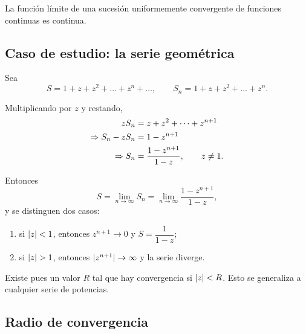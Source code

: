 \begin{observacion}
  La funci\'on l\'imite de una sucesi\'on uniformemente convergente de
  funciones continuas es continua.
\end{observacion}

\subsection{Caso de estudio: la serie geom\'etrica}
\label{subsec:serie_geometrica}

Sea
\begin{equation}
  \label{eq:geometrica}
  S=1+z+z^2+\dots+z^n+\dots,
  \qquad
  S_n=1+z+z^2+\dots+z^n .
\end{equation}

\begin{observacion}[El truco]
  Multiplicando por $z$ y restando,
  \begin{equation}
    \label{eq:truco_geometrica}
    \begin{aligned}
      zS_n&=z+z^2+\dots+z^{n+1}\\
      \Rightarrow S_n-zS_n&=1-z^{n+1}\\
      \Rightarrow S_n&=\frac{1-z^{n+1}}{1-z},\qquad z\neq 1 .
    \end{aligned}
  \end{equation}
\end{observacion}

Entonces
\begin{equation}
  \label{eq:limite_geometrica}
  S=\lim_{n\rightarrow\infty}S_n
   =\lim_{n\rightarrow\infty}\frac{1-z^{n+1}}{1-z},
\end{equation}
y se distinguen dos casos:
\begin{enumerate}
  \item si $\lvert z \rvert<1$, entonces $z^{n+1}\rightarrow 0$ y
        $S=\dfrac{1}{1-z}$;
  \item si $\lvert z \rvert>1$, entonces $\lvert z^{n+1} \rvert\rightarrow\infty$ y la serie
        diverge.
\end{enumerate}

\begin{observacion}
  Existe pues un valor $R$ tal que hay convergencia si $\lvert z \rvert<R$. Esto se
  generaliza a cualquier serie de potencias.
\end{observacion}

\subsection{Radio de convergencia}
\label{subsec:radio_convergencia}

